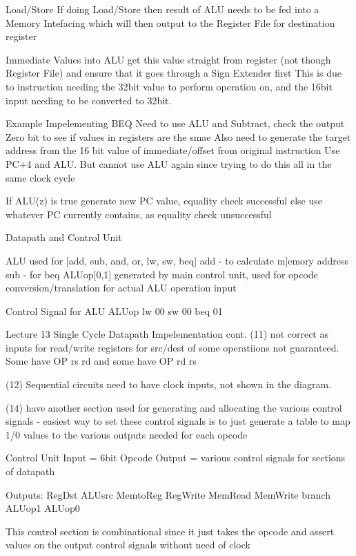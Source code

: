 \documentclass{article}
\begin{document}
		Load/Store
			If doing Load/Store then result of ALU needs to be fed into a Memory Intefacing which will then output to the Register File for destination register

		Immediate Values into ALU
			get this value straight from register (not though Register File) and ensure that it goes through a Sign Extender first
			This is due to instruction needing the 32bit value to perform operation on, and the 16bit input needing to be converted to 32bit.


	Example
		Impelementing BEQ
			Need to use ALU and Subtract, check the output Zero bit to see if values in registers are the smae
			Also need to generate the target address from the 16 bit value of immediate/offset from original instruction
				Use PC+4 and ALU. But cannot use ALU again since trying to do this all in the same clock cycle

			If ALU(z) is true
				generate new PC value, equality check successful
			else
				use whatever PC currently contains, as equality check unsuccessful

	Datapath and Control Unit

		ALU used for [add, sub, and, or, lw, sw, beq]
		add - to calculate m]emory address
		sub - for beq
		ALUop[0,1] generated by main control unit, used for opcode conversion/translation for actual ALU operation input

	Control Signal for ALU
			ALUop	
		lw	00
		sw	00
		beq	01
		
Lecture 13
	Single Cycle Datapath Impelementation cont.
		(11) not correct as inputs for read/write registers for src/dest of some operatiions not guaranteed. Some have OP rs rd and some have OP rd rs

		(12) Sequential circuits need to have clock inputs, not shown in the diagram.

		(14) have another section used for generating and allocating the various control signals
		- easiest way to set these control signals is to just generate a table to map 1/0 values to the various outputs needed for each opcode

		Control Unit
			Input = 6bit Opcode
			Output = various control signals for sections of datapath

			Outputs:
				RegDst
				ALUsrc
				MemtoReg
				RegWrite
				MemRead
				MemWrite
				branch
				ALUop1
				ALUop0

			This control section is combinational since it just takes the opcode and assert values on the output control signals without need of clock
\end{document}
